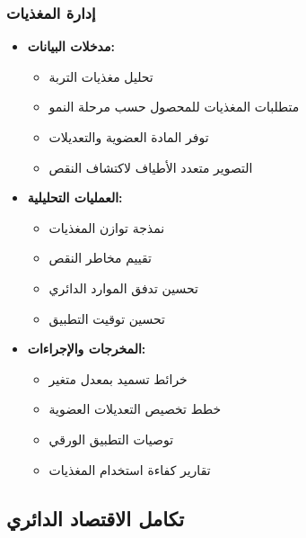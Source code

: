 \subsubsection{إدارة المغذيات}
\begin{itemize}
    \item \textbf{مدخلات البيانات:}
    \begin{itemize}
        \item تحليل مغذيات التربة
        \item متطلبات المغذيات للمحصول حسب مرحلة النمو
        \item توفر المادة العضوية والتعديلات
        \item التصوير متعدد الأطياف لاكتشاف النقص
    \end{itemize}
    
    \item \textbf{العمليات التحليلية:}
    \begin{itemize}
        \item نمذجة توازن المغذيات
        \item تقييم مخاطر النقص
        \item تحسين تدفق الموارد الدائري
        \item تحسين توقيت التطبيق
    \end{itemize}
    
    \item \textbf{المخرجات والإجراءات:}
    \begin{itemize}
        \item خرائط تسميد بمعدل متغير
        \item خطط تخصيص التعديلات العضوية
        \item توصيات التطبيق الورقي
        \item تقارير كفاءة استخدام المغذيات
    \end{itemize}
\end{itemize}

\subsection{تكامل الاقتصاد الدائري}

